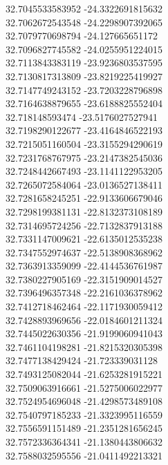 {32.7045533583952	-24.3322691815632\\
32.7062672543548	-24.2298907392065\\
32.7079770698794	-24.127665651172\\
32.7096827745582	-24.0255951224015\\
32.7113843383119	-23.9236803537595\\
32.7130817313809	-23.8219225419927\\
32.7147749243152	-23.7203228796898\\
32.7164638879655	-23.6188825552404\\
32.718148593474	-23.5176027527941\\
32.7198290122677	-23.4164846522193\\
32.7215051160504	-23.3155294290619\\
32.7231768767975	-23.2147382545036\\
32.7248442667493	-23.1141122953205\\
32.7265072584064	-23.0136527138411\\
32.7281658245251	-22.9133606679046\\
32.7298199381131	-22.8132373108189\\
32.7314695724256	-22.7132837913188\\
32.7331147009621	-22.6135012535238\\
32.7347552974637	-22.5138908368962\\
32.7363913359099	-22.4144536761987\\
32.7380227905169	-22.3151909014527\\
32.7396496357348	-22.2161036378962\\
32.7412718462464	-22.1171930059412\\
32.7428893969656	-22.0184601211324\\
32.7445022630356	-21.9199060941043\\
32.7461104198281	-21.8215320305398\\
32.7477138429424	-21.723339031128\\
32.7493125082044	-21.6253281915221\\
32.7509063916661	-21.5275006022977\\
32.7524954696048	-21.4298573489108\\
32.7540797185233	-21.3323995116559\\
32.7556591151489	-21.2351281656245\\
32.7572336364341	-21.1380443806632\\
32.7588032595556	-21.0411492213321\\
}
